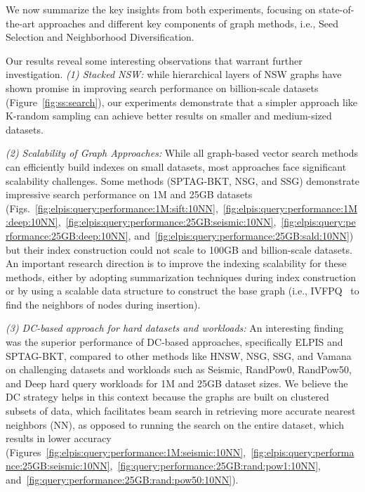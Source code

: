 We now summarize the key insights from both experiments, focusing on state-of-the-art approaches and different key components of graph methods, i.e., Seed Selection and Neighborhood Diversification.

 Our results reveal some interesting observations that warrant further investigation. 
\textit{(1) Stacked NSW:} while hierarchical layers of NSW graphs have shown promise in improving search performance on billion-scale datasets (Figure~\ref{fig:ss:search}), our experiments demonstrate that a simpler approach like K-random sampling can achieve better results on smaller and medium-sized datasets. 

\textit{(2) Scalability of Graph Approaches:} While all graph-based vector search methods can efficiently build indexes on small datasets, most approaches face significant scalability challenges. Some methods (SPTAG-BKT, NSG, and SSG) demonstrate impressive search performance on 1M and 25GB datasets (Figs.~\ref{fig:elpis:query:performance:1M:sift:10NN},~\ref{fig:elpis:query:performance:1M:deep:10NN},~\ref{fig:elpis:query:performance:25GB:seismic:10NN},~\ref{fig:elpis:query:performance:25GB:deep:10NN}, and~\ref{fig:elpis:query:performance:25GB:sald:10NN}) but their index construction could not scale to 100GB and billion-scale datasets. An important research direction is to improve the indexing scalability for these methods, either by adopting summarization techniques during index construction or by using a scalable data structure to construct the base graph (i.e., IVFPQ~\cite{faiss} to find the neighbors of nodes during insertion).

\textit{(3) DC-based approach for hard datasets and workloads:} An interesting finding was the superior performance of DC-based approaches, specifically ELPIS and SPTAG-BKT, compared to other methods like HNSW, NSG, SSG, and Vamana on challenging datasets and workloads such as Seismic, RandPow0, RandPow50, and Deep hard query workloads for 1M and 25GB dataset sizes. We believe the DC strategy helps in this context because the graphs are built on clustered subsets of data, which facilitates beam search in retrieving more accurate nearest neighbors (NN), as opposed to running the search on the entire dataset, which results in lower accuracy (Figures~\ref{fig:elpis:query:performance:1M:seismic:10NN},~\ref{fig:elpis:query:performance:25GB:seismic:10NN},~\ref{fig:query:performance:25GB:rand:pow1:10NN}, and~\ref{fig:query:performance:25GB:rand:pow50:10NN}).

